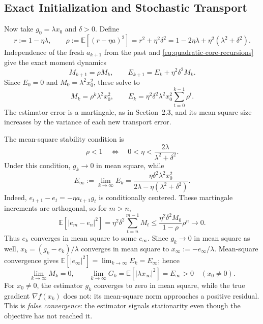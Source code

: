 \subsection{Exact Initialization and Stochastic Transport}
\label{subsec:exact-init-stochastic-transport}

Now take $g_0=\lambda x_0$ and $\delta>0$. Define
\[
r:=1-\eta\lambda,\qquad
\rho:=\mathbb{E}[(r-\eta a)^2]
=r^2+\eta^2\delta^2
=1-2\eta\lambda+\eta^2(\lambda^2+\delta^2).
\]
Independence of the fresh $a_{k+1}$ from the past and
\eqref{eq:quadratic-core-recursions} give the exact moment dynamics
\begin{equation}
\label{eq:quadratic-moment-recursions}
M_{k+1}=\rho M_k,\qquad
E_{k+1}=E_k+\eta^2\delta^2M_k.
\end{equation}
Since $E_0=0$ and $M_0=\lambda^2x_0^2$, these solve to
\begin{equation}
\label{eq:quadratic-exact-init-moments}
M_k=\rho^k\lambda^2x_0^2,\qquad
E_k=\eta^2\delta^2\lambda^2x_0^2
       \sum_{t=0}^{k-1}\rho^t.
\end{equation}
The estimator error is a martingale, as in Section~2.3, and its
mean-square size increases by the variance of each new transport
error.

The mean-square stability condition is
\begin{equation}
\label{eq:quadratic-stability}
\rho<1
\quad\Longleftrightarrow\quad
0<\eta<\frac{2\lambda}{\lambda^2+\delta^2}.
\end{equation}
Under this condition, $g_k\to0$ in mean square, while
\begin{equation}
\label{eq:quadratic-exact-init-residual}
E_\infty:=\lim_{k\to\infty}E_k
=\frac{\eta\delta^2\lambda^2x_0^2}
       {2\lambda-\eta(\lambda^2+\delta^2)}.
\end{equation}
Indeed, $e_{t+1}-e_t=-\eta a_{t+1}g_t$ is conditionally centered.
These martingale increments are orthogonal, so for $m>n$,
\[
\mathbb{E}[|e_m-e_n|^2]
=\eta^2\delta^2\sum_{t=n}^{m-1}M_t
\leq\frac{\eta^2\delta^2M_0}{1-\rho}\rho^n
\longrightarrow0.
\]
Thus $e_k$ converges in mean square to some $e_\infty$. Since
$g_k\to0$ in mean square as well,
$x_k=(g_k-e_k)/\lambda$ converges in mean square to
$x_\infty:=-e_\infty/\lambda$. Mean-square convergence gives
$\mathbb E[|e_\infty|^2]=\lim_{k\to\infty}E_k=E_\infty$; hence
\[
\lim_{k\to\infty}M_k=0,
\qquad
\lim_{k\to\infty}G_k
=\mathbb{E}[|\lambda x_\infty|^2]
=E_\infty>0\quad(x_0\neq0).
\]
For $x_0\neq0$, the estimator $g_k$ converges to zero in mean
square, while the true gradient $\nabla f(x_k)$ does not: its
mean-square norm approaches a positive residual. This is \emph{false
convergence}: the estimator signals stationarity even though the
objective has not reached it.

